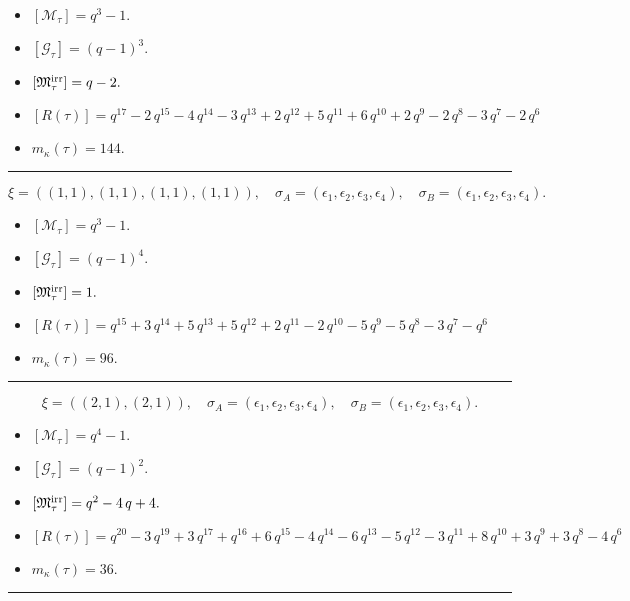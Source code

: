 \documentclass[10pt,a4paper]{amsart}
\begin{document}
\begin{itemize}
 \item $[\mathcal{M}_{\tau}] = q^{3} - 1 .$

 \item $[\mathcal{G}_{\tau}] = {\left(q - 1\right)}^{3} .$

 \item $[{\frak M}_{\tau}^{\textrm{irr}}] = q - 2 .$

 \item $[R(\tau)] = q^{17} - 2 \, q^{15} - 4 \, q^{14} - 3 \, q^{13} + 2 \, q^{12} + 5 \, q^{11} + 6 \, q^{10} + 2 \, q^{9} - 2 \, q^{8} - 3 \, q^{7} - 2 \, q^{6} $

 \item $m_{\kappa}(\tau) = 144 .$

 \end{itemize}
\noindent\rule{8cm}{0.4pt}

$$\xi = ({(1, 1), (1, 1), (1, 1)}, {(1, 1)}),\quad \sigma_A = ({{\epsilon_1}, {\epsilon_2}, {\epsilon_3}}, {{\epsilon_4}}),\quad \sigma_B = ({{\epsilon_1}, {\epsilon_2}, {\epsilon_3}}, {{\epsilon_4}}).$$

\begin{itemize}
 \item $[\mathcal{M}_{\tau}] = q^{3} - 1 .$

 \item $[\mathcal{G}_{\tau}] = {\left(q - 1\right)}^{4} .$

 \item $[{\frak M}_{\tau}^{\textrm{irr}}] = 1 .$

 \item $[R(\tau)] = q^{15} + 3 \, q^{14} + 5 \, q^{13} + 5 \, q^{12} + 2 \, q^{11} - 2 \, q^{10} - 5 \, q^{9} - 5 \, q^{8} - 3 \, q^{7} - q^{6} $

 \item $m_{\kappa}(\tau) = 96 .$

 \end{itemize}
\noindent\rule{8cm}{0.4pt}

$$\xi = ({(2, 1)}, {(2, 1)}),\quad \sigma_A = ({{\epsilon_1, \epsilon_2}}, {{\epsilon_3, \epsilon_4}}),\quad \sigma_B = ({{\epsilon_1, \epsilon_2}}, {{\epsilon_3, \epsilon_4}}).$$

\begin{itemize}
 \item $[\mathcal{M}_{\tau}] = q^{4} - 1 .$

 \item $[\mathcal{G}_{\tau}] = {\left(q - 1\right)}^{2} .$

 \item $[{\frak M}_{\tau}^{\textrm{irr}}] = q^{2} - 4 \, q + 4 .$

 \item $[R(\tau)] = q^{20} - 3 \, q^{19} + 3 \, q^{17} + q^{16} + 6 \, q^{15} - 4 \, q^{14} - 6 \, q^{13} - 5 \, q^{12} - 3 \, q^{11} + 8 \, q^{10} + 3 \, q^{9} + 3 \, q^{8} - 4 \, q^{6} $

 \item $m_{\kappa}(\tau) = 36 .$

 \end{itemize}
\noindent\rule{8cm}{0.4pt}
\end{document}

